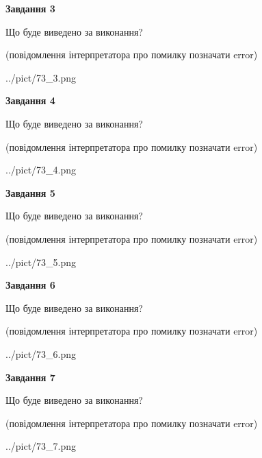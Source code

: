 \documentclass[12pt, ukrainian]{article}
\begin{document}
{\begin {large}
{\begin {center}\textbf{Завдання 3}\end {center}}\par
Що буде виведено за виконання?\par
 (повідомлення інтерпретатора про помилку позначати error)\par
\begin{center}
	{../pict/73_3.png}
\end{center}
\newpage

{\begin {center}\textbf{Завдання 4}\end {center}}\par
Що буде виведено за виконання?\par
 (повідомлення інтерпретатора про помилку позначати error)\par
\begin{center}
	{../pict/73_4.png}
\end{center}
\newpage

{\begin {center}\textbf{Завдання 5}\end {center}}\par
Що буде виведено за виконання?\par
 (повідомлення інтерпретатора про помилку позначати error)\par
\begin{center}
	{../pict/73_5.png}
\end{center}
\newpage

{\begin {center}\textbf{Завдання 6}\end {center}}\par
Що буде виведено за виконання?\par
 (повідомлення інтерпретатора про помилку позначати error)\par
\begin{center}
	{../pict/73_6.png}
\end{center}
\newpage

{\begin {center}\textbf{Завдання 7}\end {center}}\par
Що буде виведено за виконання?\par
 (повідомлення інтерпретатора про помилку позначати error)\par
\begin{center}
	{../pict/73_7.png}
\end{center}
\newpage


\end{large}}
\end{document}
